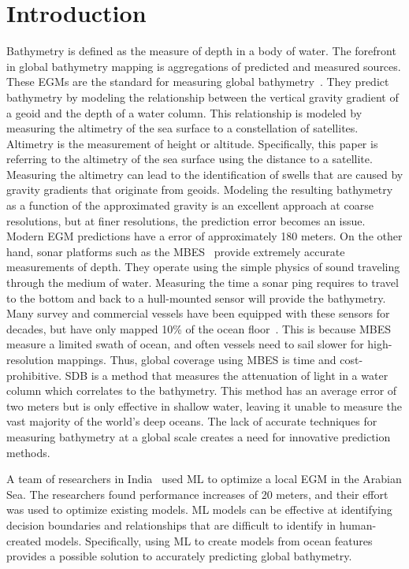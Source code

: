 \section{Introduction}
\setlength{\parindent}{10ex}
Bathymetry is defined as the measure of depth in a body of water.
The forefront in global bathymetry mapping is aggregations of predicted and measured sources. 
These \ac{EGM}s are the standard for measuring global bathymetry~\cite{becker2009global,smith1994bathymetric,smith1997global,smith2010planning}.
They predict bathymetry by modeling the relationship between the vertical gravity gradient of a geoid and the depth of a water column.
This relationship is modeled by measuring the altimetry of the sea surface to a constellation of satellites.
Altimetry is the measurement of height or altitude. 
Specifically, this paper is referring to the altimetry of the sea surface using the distance to a satellite.
Measuring the altimetry can lead to the identification of swells that are caused by gravity gradients that originate from geoids.
Modeling the resulting bathymetry as a function of the approximated gravity is an excellent approach at coarse resolutions, but at finer resolutions, the prediction error becomes an issue.
Modern \ac{EGM} predictions have a error of approximately 180 meters.
On the other hand, sonar platforms such as the \ac{MBES}~\cite{farr1980multibeam} provide extremely accurate measurements of depth.
They operate using the simple physics of sound traveling through the medium of water.
Measuring the time a sonar ping requires to travel to the bottom and back to a hull-mounted sensor will provide the bathymetry.
Many survey and commercial vessels have been equipped with these sensors for decades, but have only mapped 10\% of the ocean floor~\cite{becker2009global}.
This is because \ac{MBES} measure a limited swath of ocean, and often vessels need to sail slower for high-resolution mappings.
Thus, global coverage using \ac{MBES} is time and cost-prohibitive.
\ac{SDB} is a method that measures the attenuation of light in a water column which correlates to the bathymetry.
This method has an average error of two meters but is only effective in shallow water, leaving it unable to measure the vast majority of the world's deep oceans.
The lack of accurate techniques for measuring bathymetry at a global scale creates a need for innovative prediction methods.

\par
A team of researchers in India~\cite{jena2012prediction} used \ac{ML} to optimize a local \ac{EGM} in the Arabian Sea.
The researchers found performance increases of 20 meters, and their effort was used to optimize existing models.
\ac{ML} models can be effective at identifying decision boundaries and relationships that are difficult to identify in human-created models.
Specifically, using \ac{ML} to create models from ocean features provides a possible solution to accurately predicting global bathymetry.

